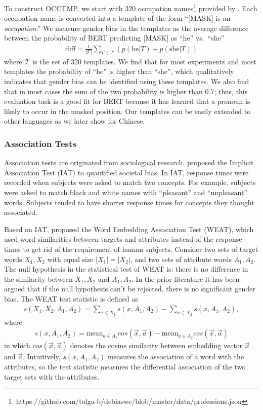 To construct OCCTMP,
we start with 
320 occupation
names\footnote{https://github.com/tolga-b/debiaswe/blob/master/data/professions.json}
provided by \cite{bolukbasi2016man}.
Each occupation name is converted into a template of the form
``[MASK] is an \textit{occupation}.''
We measure
gender bias
in the templates as the average difference
between the probability of BERT predicting [MASK] as ``he''
vs.\ ``she''
\begin{eqnarray}
\text{diff}=\frac{1}{|{\mathcal T}|} \sum_{T \in
	{\mathcal T}}(p(\mbox{he}| T) - p(\mbox{she}|T))\nonumber
\end{eqnarray}
where $\mathcal T$ is the set of 320 templates.  We find
that for most experiments and most templates the probability
of ``he'' is higher than ``she'', which qualitatively
indicates that gender bias can be identified using these templates. We
also find that in most cases the sum of the two probability
is higher than 0.7; thus, this evaluation task is a good fit
for BERT because it has learned that a pronoun is likely to
occur in the masked position.
Our templates  can be easily extended to other
languages
as we later show for
Chinese.
\subsubsection{Association Tests}\label{sec:weat}
Association tests are originated from sociological research. \cite{greenwald1998measuring} proposed the Implicit Association Test (IAT) to quantified societal bias. In IAT, response times were recorded when subjects were asked to match two concepts. For example, subjects were asked to match black and white names with “pleasant” and “unpleasant” words. Subjects tended to have shorter response times for concepts they thought associated. 

Based on IAT, \cite{caliskan2017semantics} proposed the Word Embedding Association Test (WEAT), which used word similarities between targets and attributes instead of the response times to get rid of the requirement of human subjects. Consider two sets of target words $X_1,X_2$ with equal size $|X_1|=|X_2|$, and two sets of attribute words $A_1,A_2$. The null hypothesis in the statistical test of WEAT is: there is no difference in the similarity between $X_1,X_2$ and $A_1,A_2$. In the prior literature it has been argued that if the null hypothesis can't be rejected, there is no significant gender bias.  
The WEAT test statistic is defined as
\begin{eqnarray}
s(X_1,X_2,A_1,A_2)=\sum_{x\in X_1}s(x,A_1,A_2)-\sum_{x\in X_2}s(x,A_1,A_2),\nonumber
\end{eqnarray}
where
\begin{eqnarray}
s(x,A_1,A_2)=\mbox{mean}_{a\in A_1}cos(\vec{x},\vec{a})-\mbox{mean}_{a\in A_2}cos(\vec{x},\vec{a})\nonumber
\end{eqnarray}
in which $cos(\vec{x},\vec{a})$ denotes the cosine similarity between embedding vector $\vec{x}$ and $\vec{a}$. Intuitively, $s(x,A_1,A_2)$ measures the association of a word with the attributes, so the test statistic measures the differential association of the two target sets with the attributes. 

